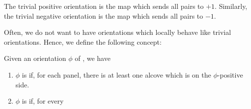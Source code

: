\documentclass[12pt]{article}
\begin{document}
\begin{example}
    The trivial positive orientation is the map which sends all pairs to $+1$. Similarly, the trivial negative orientation is the map which sends all pairs to $-1$. 
\end{example}

Often, we do not want to have orientations which locally behave like trivial orientations. Hence, we define the following concept:

\begin{definition}
    Given an orientation $\phi$ of \sg, we have
    \begin{enumerate}
        \item $\phi$ is  if, for each panel, there is at least one alcove which is on the $\phi$-positive side.
        \item $\phi$ is  if, for every
    \end{enumerate}
\end{definition}
\end{document}
